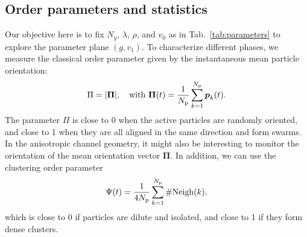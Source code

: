 \documentclass[aps,prl,twocolumn,amsmath,amssymb,superscriptaddress]{revtex4-1}
\begin{document}
\subsection{Order parameters and statistics}
Our objective here is to fix $N_y$, $\lambda$, $\rho$, and $v_0$ as in Tab.~\ref{tab:parameters} to explore the parameter plane $(g,v_1)$. To characterize different phases, we measure the classical order parameter given by the instantaneous mean particle orientation:
\begin{equation}
\Pi = |\boldsymbol{\Pi}|, \quad\mbox{with } \boldsymbol{\Pi}(t) = \frac{1}{N_{\rm p}}\sum_{k=1}^{N_{\rm p}} \boldsymbol{p}_{k}(t).
\label{eq:defPhia}
\end{equation}
The parameter $\Pi$  is close to 0 when the active particles are randomly oriented, and close to 1 when they are all aligned in the same direction and form swarms. In the anisotropic channel geometry, it might also be interesting to monitor the orientation of the mean orientation vector $\boldsymbol{\Pi}$. In addition, we can use the clustering order parameter
\begin{equation}
\Psi(t) = \frac{1}{4N_{\rm p}}\sum_{k=1}^{N_{\rm p}} \# {\rm Neigh}(k),
\end{equation}
which is close to 0 if particles are dilute and isolated, and close to 1 if they form dense clusters.
\end{document}
